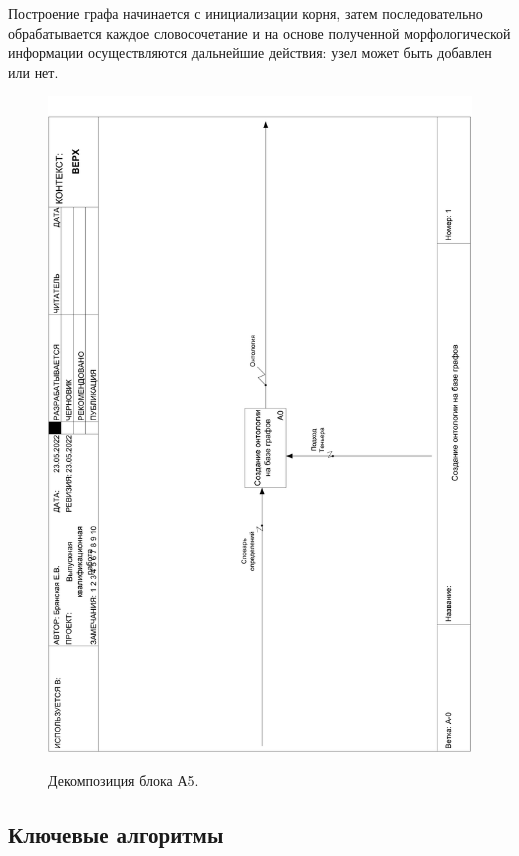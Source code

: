 \newpage
Построение графа начинается с инициализации корня, затем последовательно обрабатывается каждое словосочетание и на основе полученной морфологической информации осуществляются дальнейшие действия: узел может быть добавлен или нет. 
\begin{figure}[h]
	\begin{center}
		{\includegraphics[scale = 0.39, angle=-90, page=3]{img/idef0/pdf/ontologyTree.pdf}}
		\caption{Декомпозиция блока А5.}
		\label{fig27:image}
	\end{center}
\end{figure}

\newpage

\subsection{Ключевые алгоритмы}
